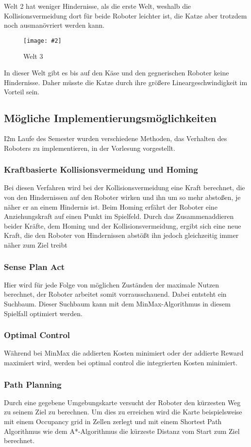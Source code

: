 \documentclass[
a4paper,     %
12pt         %
]{scrartcl}  %
\newcommand{\mygraphics}[3]{
\begin{figure}[!h]
  \begin{center}
    \texttt{[image: \#2]} \\
    \caption{#3}\label{fig:#2}
  \end{center}
\end{figure}

}
\begin{document}
Welt 2 hat weniger Hindernisse, als die erste Welt, weshalb die Kollisionsvermeidung dort für beide Roboter leichter ist, die Katze aber trotzdem noch ausmanövriert werden kann.
\mygraphics{0.5\textwidth}{Welt3.png}{Welt 3}

In dieser Welt gibt es bis auf den Käse und den gegnerischen Roboter keine Hindernisse. Daher müsste die Katze durch ihre größere Lineargeschwindigkeit im Vorteil sein.
\subsection{Mögliche Implementierungsmöglichkeiten}
I2m Laufe des Semester wurden verschiedene Methoden, das Verhalten des Roboters zu implementieren, in der Vorlesung vorgestellt.
\subsubsection{Kraftbasierte Kollisionsvermeidung und Homing}
Bei diesen Verfahren wird bei der Kollisionsvermeidung eine Kraft berechnet, die von den Hindernissen auf den Roboter wirken und ihn um so mehr abstoßen, je näher er an einem Hindernis ist. Beim Homing erfährt der Roboter eine Anziehungskraft auf einen Punkt im Spielfeld. Durch das Zusammenaddieren beider Kräfte, dem Homing und der Kollisionsvermeidung, ergibt sich eine neue Kraft, die den Roboter von Hindernissen abstößt ihn jedoch gleichzeitig immer näher zum Ziel treibt 
\subsubsection{Sense Plan Act}
Hier wird für jede Folge von möglichen Zuständen der maximale Nutzen berechnet, der Roboter arbeitet somit vorrausschauend. Dabei entsteht ein Suchbaum. Dieser Suchbaum kann mit dem MinMax-Algorithmus in diesem Spielfall optimiert werden.
\subsubsection{Optimal Control}
Während bei MinMax die addierten Kosten minimiert oder der addierte Reward maximiert wird, werden bei optimal control die integrierten Kosten minimiert.
\subsubsection{Path Planning}
Durch eine gegebene Umgebungskarte versucht der Roboter den kürzesten Weg zu seinem Ziel zu berechnen. Um dies zu erreichen wird die Karte beispielsweise mit einem Occupancy grid in Zellen zerlegt und mit einem Shortest Path Algorithmus wie dem A*-Algorithmus die kürzeste Distanz vom Start zum Ziel berechnet.  
\end{document}
